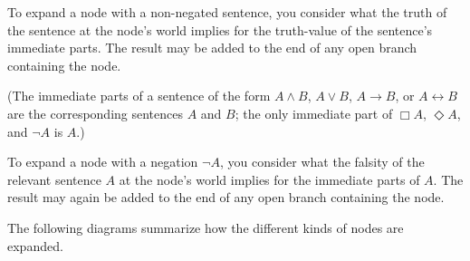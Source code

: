 To expand a node with a non-negated sentence, you consider what the truth of the
sentence at the node's world implies for the truth-value of the sentence's
immediate parts. The result may be added to the end of any open branch
containing the node.

(The immediate parts of a sentence of the form $A\land B$, $A \lor B$,
$A \to B$, or $A \leftrightarrow B$ are the corresponding sentences $A$ and $B$;
the only immediate part of $\Box A$, $\Diamond A$, and $\neg A$ is $A$.)

To expand a node with a negation $\neg A$, you consider what the falsity of the
relevant sentence $A$ at the node's world implies for the immediate parts of
$A$. The result may again be added to the end of any open branch containing the
node.

The following diagrams summarize how the different kinds of nodes are expanded.

\bigskip

\begin{minipage}{0.33\textwidth}\centering
{}
\end{minipage}
\begin{minipage}{0.33\textwidth}\centering
{}
\end{minipage}
\begin{minipage}{0.33\textwidth}\centering
{}
\end{minipage}

\vspace{10mm}

